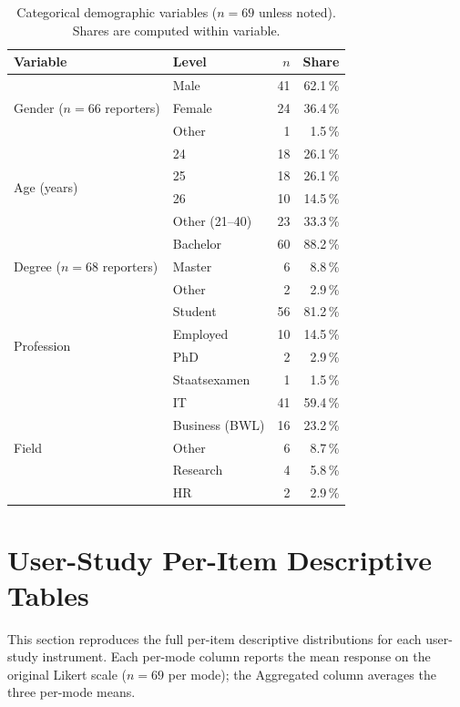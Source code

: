 \begin{table}[htbp]
\centering
\caption{Categorical demographic variables ($n = 69$ unless noted).
Shares are computed within variable.}
\label{tab:demographics-categorical}
\small
\begin{tabular}{@{}l l r r@{}}
\toprule
Variable & Level & $n$ & Share \\
\midrule
\multirow{3}{*}{Gender ($n = 66$ reporters)}
  & Male           & 41 & 62.1\,\% \\
  & Female         & 24 & 36.4\,\% \\
  & Other          &  1 & \phantom{0}1.5\,\% \\
\midrule
\multirow{4}{*}{Age (years)}
  & 24             & 18 & 26.1\,\% \\
  & 25             & 18 & 26.1\,\% \\
  & 26             & 10 & 14.5\,\% \\
  & Other (21--40) & 23 & 33.3\,\% \\
\midrule
\multirow{3}{*}{Degree ($n = 68$ reporters)}
  & Bachelor       & 60 & 88.2\,\% \\
  & Master         &  6 & \phantom{0}8.8\,\% \\
  & Other          &  2 & \phantom{0}2.9\,\% \\
\midrule
\multirow{4}{*}{Profession}
  & Student        & 56 & 81.2\,\% \\
  & Employed       & 10 & 14.5\,\% \\
  & PhD            &  2 & \phantom{0}2.9\,\% \\
  & Staatsexamen   &  1 & \phantom{0}1.5\,\% \\
\midrule
\multirow{5}{*}{Field}
  & IT             & 41 & 59.4\,\% \\
  & Business (BWL) & 16 & 23.2\,\% \\
  & Other          &  6 & \phantom{0}8.7\,\% \\
  & Research       &  4 & \phantom{0}5.8\,\% \\
  & HR             &  2 & \phantom{0}2.9\,\% \\
\bottomrule
\end{tabular}
\end{table}


\section{User-Study Per-Item Descriptive Tables}
\label{app:user-study-items}

This section reproduces the full per-item descriptive
distributions for each user-study instrument. Each per-mode column
reports the mean response on the original Likert scale ($n = 69$
per mode); the Aggregated column averages the three per-mode means.

